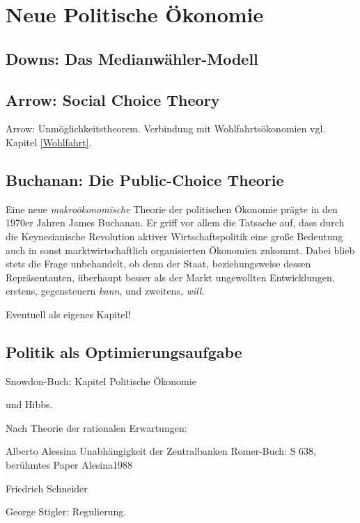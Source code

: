 %
%
%

\chapter{Neue Politische Ökonomie}
\label{Neue_Politik}




\section{Downs: Das Medianwähler-Modell}

\section{Arrow: Social Choice Theory}

Arrow: Unmöglichkeitstheorem.
Verbindung mit Wohlfahrtsökonomien vgl. Kapitel \ref{Wohlfahrt}.


\section{Buchanan: Die Public-Choice Theorie}
\label{Pol_Econ}

Eine neue \textit{makroökonomische} Theorie der politischen Ökonomie prägte in den 1970er Jahren James Buchanan. Er griff vor allem die Tatsache auf, dass durch die Keynesianische Revolution aktiver Wirtschaftspolitik eine große Bedeutung auch in sonst marktwirtschaftlich organisierten Ökonomien zukommt. Dabei blieb stets die Frage unbehandelt, ob denn der Staat, beziehungsweise dessen Repräsentanten, überhaupt besser als der Markt ungewollten Entwicklungen, erstens, gegensteuern \textit{kann}, und zweitens, \textit{will}.

Eventuell als eigenes Kapitel!


\section{Politik als Optimierungsaufgabe}
Snowdon-Buch: Kapitel Politische Ökonomie

\textcite{Nordhaus1975} und Hibbs.

Nach Theorie der rationalen Erwartungen:

Alberto Alessina
Unabhängigkeit der Zentralbanken Romer-Buch: S 638, berühmtes Paper Alesina1988

Friedrich Schneider


George Stigler: Regulierung.